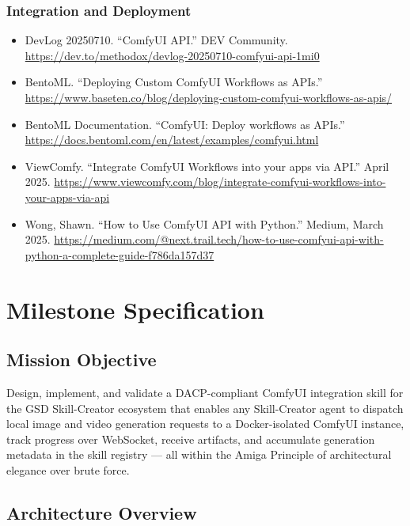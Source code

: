 \documentclass[11pt,letterpaper]{article}
\newcommand{\stageheader}[2]{%
  \noindent\colorbox{#2}{\makebox[\textwidth][l]{%
    \textcolor{white}{\bfseries\sffamily\hspace{6pt}#1\hspace{6pt}}}}%
  \vspace{0.5em}\par%
}
\begin{document}
\subsubsection{Integration and Deployment}
\begin{itemize}[leftmargin=1.5em]
  \item DevLog 20250710. ``ComfyUI API.'' DEV Community. \url{https://dev.to/methodox/devlog-20250710-comfyui-api-1mi0}
  \item BentoML. ``Deploying Custom ComfyUI Workflows as APIs.'' \url{https://www.baseten.co/blog/deploying-custom-comfyui-workflows-as-apis/}
  \item BentoML Documentation. ``ComfyUI: Deploy workflows as APIs.'' \url{https://docs.bentoml.com/en/latest/examples/comfyui.html}
  \item ViewComfy. ``Integrate ComfyUI Workflows into your apps via API.'' April 2025. \url{https://www.viewcomfy.com/blog/integrate-comfyui-workflows-into-your-apps-via-api}
  \item Wong, Shawn. ``How to Use ComfyUI API with Python.'' Medium, March 2025. \url{https://medium.com/@next.trail.tech/how-to-use-comfyui-api-with-python-a-complete-guide-f786da157d37}
\end{itemize}

\newpage

\stageheader{STAGE 3 --- MISSION PACKAGE}{tertiary}

\section{Milestone Specification}

\subsection{Mission Objective}

Design, implement, and validate a DACP-compliant ComfyUI integration skill for the
GSD Skill-Creator ecosystem that enables any Skill-Creator agent to dispatch local
image and video generation requests to a Docker-isolated ComfyUI instance, track
progress over WebSocket, receive artifacts, and accumulate generation metadata in the
skill registry --- all within the Amiga Principle of architectural elegance over
brute force.

\subsection{Architecture Overview}
\end{document}
